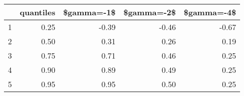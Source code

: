 \begin{table}[ht]
\centering
\begin{tabular}{rrrrr}
  \hline
 & quantiles & \$gamma=-1\$ & \$gamma=-2\$ & \$gamma=-4\$ \\ 
  \hline
1 & 0.25 & -0.39 & -0.46 & -0.67 \\ 
  2 & 0.50 & 0.31 & 0.26 & 0.19 \\ 
  3 & 0.75 & 0.71 & 0.46 & 0.25 \\ 
  4 & 0.90 & 0.89 & 0.49 & 0.25 \\ 
  5 & 0.95 & 0.95 & 0.50 & 0.25 \\ 
   \hline
\end{tabular}
\end{table}
